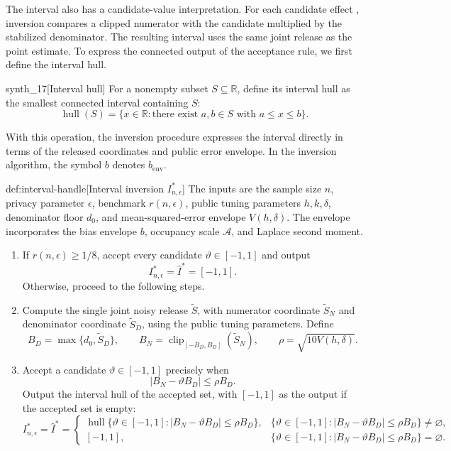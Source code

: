\documentclass[11pt]{article}
\begin{document}
The interval also has a candidate-value interpretation. For each candidate effect , inversion compares a clipped numerator with the candidate multiplied by the stabilized denominator. The resulting interval  uses the same joint release as the point estimate. To express the connected output of the acceptance rule, we first define the interval hull.
\begin{definitionv}{synth_17}[Interval hull]
For a nonempty subset \(S\subseteq\mathbb R\), define its interval hull as the smallest connected interval containing \(S\):
\[
\operatorname{hull}(S)
=
\{x\in\mathbb R:\text{there exist }a,b\in S\text{ with }a\le x\le b\}.
\]
\end{definitionv}

With this operation, the inversion procedure expresses the interval directly in terms of the released coordinates and public error envelope. In the inversion algorithm, the symbol \(b\) denotes \(b_{\mathrm{env}}\).
\begin{algorithmv}{def:interval-handle}[Interval inversion $I^*_{n,\epsilon}$]
The inputs are the sample size \(n\), privacy parameter \(\epsilon\), benchmark \(r(n,\epsilon)\), public tuning parameters \(h,k,\delta\), denominator floor \(d_0\), and mean-squared-error envelope \(V(h,\delta)\). The envelope incorporates the bias envelope \(b\), occupancy scale \(\mathcal A\), and Laplace second moment.
\begin{enumerate}
\item If \(r(n,\epsilon)\ge 1/8\), accept every candidate \(\vartheta\in[-1,1]\) and output
\[
I^*_{n,\epsilon}=\widehat I^*=[-1,1].
\]
Otherwise, proceed to the following steps.
\item Compute the single joint noisy release \(\widetilde S\), with numerator coordinate \(\widetilde S_N\) and denominator coordinate \(\widetilde S_D\), using the public tuning parameters. Define
\[
B_D=\max\{d_0,\widetilde S_D\},\qquad
B_N=\operatorname{clip}_{[-B_D,B_D]}(\widetilde S_N),\qquad
\rho=\sqrt{10V(h,\delta)}.
\]
\item Accept a candidate \(\vartheta\in[-1,1]\) precisely when
\[
|B_N-\vartheta B_D|\le \rho B_D.
\]
Output the interval hull of the accepted set, with \([-1,1]\) as the output if the accepted set is empty:
\[
I^*_{n,\epsilon}=\widehat I^*=
\begin{cases}
\operatorname{hull}\{\vartheta\in[-1,1]:|B_N-\vartheta B_D|\le\rho B_D\},
& \{\vartheta\in[-1,1]:|B_N-\vartheta B_D|\le\rho B_D\}\ne\varnothing,\\
[-1,1],
& \{\vartheta\in[-1,1]:|B_N-\vartheta B_D|\le\rho B_D\}=\varnothing.
\end{cases}
\]
\end{enumerate}
\end{algorithmv}
\end{document}
